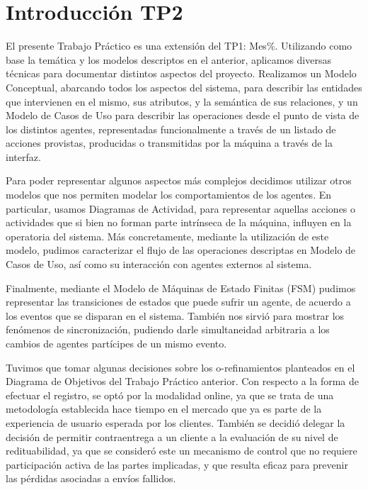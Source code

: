 
\section{Introducción TP2}

El presente Trabajo Práctico es una extensión del TP1: Mes\%. Utilizando como base la temática y los modelos descriptos en el anterior, aplicamos diversas técnicas para documentar distintos aspectos del proyecto. Realizamos un Modelo Conceptual, abarcando todos los aspectos del sistema, para describir las entidades que intervienen en el mismo, sus atributos, y la semántica de sus relaciones, y un Modelo de Casos de Uso para describir las operaciones desde el punto de vista de los distintos agentes, representadas funcionalmente a través de un listado de acciones provistas, producidas o transmitidas por la máquina a través de la interfaz.

Para poder representar algunos aspectos más complejos decidimos utilizar otros modelos que nos permiten modelar los comportamientos de los agentes. En particular, usamos Diagramas de Actividad, para representar aquellas acciones o actividades que si bien no forman parte intrínseca de la máquina, influyen en la operatoria del sistema. Más concretamente, mediante la utilización de este modelo, pudimos caracterizar el flujo de las operaciones descriptas en Modelo de Casos de Uso, así como su interacción con agentes externos al sistema.

Finalmente, mediante el Modelo de Máquinas de Estado Finitas (FSM) pudimos representar las transiciones de estados que puede sufrir un agente, de acuerdo a los eventos que se disparan en el sistema. También nos sirvió para mostrar los fenómenos de sincronización, pudiendo darle simultaneidad arbitraria a los cambios de agentes partícipes de un mismo evento.

Tuvimos que tomar algunas decisiones sobre los o-refinamientos planteados en el Diagrama de Objetivos del Trabajo Práctico anterior. Con respecto a la forma de efectuar el registro, se optó por la modalidad online, ya que se trata de una metodología establecida hace tiempo en el mercado que ya es parte de la experiencia de usuario esperada por los clientes. También se decidió delegar la decisión de permitir contraentrega a un cliente a la evaluación de su nivel de redituabilidad, ya que se consideró este un mecanismo de control que no requiere participación activa de las partes implicadas, y que resulta eficaz para prevenir las pérdidas asociadas a envíos fallidos.

